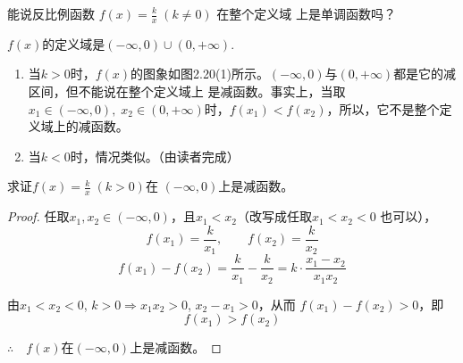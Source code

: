 \begin{example}
    能说反比例函数
$f(x)=\frac{k}{x}\; (k\ne 0)$
在整个定义域
上是单调函数吗？
\end{example}

\begin{figure}[htp]
    \centering
{}
    \caption{}
\end{figure}

\begin{analyze}
$f(x)$的定义域是$(-\infty,0)\cup (0,+\infty)$.
\begin{enumerate}[(1)]
    \item 当$k>0$时，$f(x)$的图象如图2.20(1)所示。$(-\infty,0)$与$ (0,+\infty)$都是它的减区间，但不能说在整个定义域上
    是减函数。事实上，当取$x_1\in (-\infty,0),\; x_2\in (0,+\infty)$时，$f(x_1)<f(x_2)$，所以，它不是整个定义域上的减函数。
    \item 当$k<0$时，情况类似。（由读者完成）
\end{enumerate}
\end{analyze}

\begin{example}
    求证$f(x)=\frac{k}{x}\; (k>0)$在
$(-\infty,0)$上是减函数。
\end{example}

\begin{proof}
任取$x_1,x_2\in(-\infty,0)$，且$x_1<x_2$（改写成任取$x_1<x_2<0$
也可以），
\[f(x_1)=\frac{k}{x_1},\qquad f(x_2)=\frac{k}{x_2}\]
    \[f(x_1)-f(x_2)=\frac{k}{x_1}-\frac{k}{x_2}=k\cdot \frac{x_1-x_2}{x_1x_2}\]

    由$x_1<x_2<0$, $k>0\Longrightarrow x_1x_2>0$, 
$x_2-x_1>0$，从而
$f(x_1)-f(x_2)>0$，即
\[f(x_1)>f(x_2)\]

$\therefore\quad f(x)$在$(-\infty,0)$上是减函数。
\end{proof}

